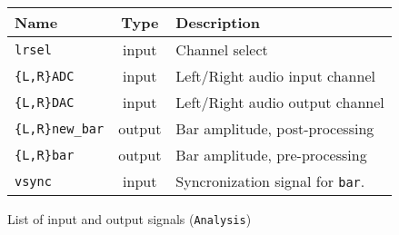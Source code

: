 \begin{figure}[h]
  \centering
  \caption{List of input and output signals (\texttt{Analysis})}
  \begin{tabular}{|l|c|l|}
    \hline
    Name & Type & Description \\    \hline
    \texttt{lrsel} & input & Channel select \\    \hline
    \texttt{\{L,R\}ADC} & input & Left/Right audio input channel \\    \hline
    \texttt{\{L,R\}DAC} & input & Left/Right audio output channel \\    \hline
    \texttt{\{L,R\}new\_bar} & output & Bar amplitude, post-processing\\    \hline
    \texttt{\{L,R\}bar} & output & Bar amplitude, pre-processing\\    \hline
	\texttt{vsync} & input & Syncronization signal for \texttt{bar}. \\    \hline
  \end{tabular}
  \label{tab:analsig}
\end{figure}
